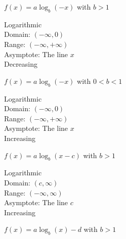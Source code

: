 \begin{multicols}{2}
\begin{center}
        $f(x) = a \log_b (- x)$ with $b > 1$

        Logarithmic\\
        Domain: $(-\infty, 0)$\\
        Range: $(-\infty, + \infty)$\\
        Asymptote: The line $x$\\
        Decreasing
        \vspace{10mm}
    \end{center}
    \hline
    \vspace{4mm}
    \begin{center}
        $f(x) = a \log_b (- x)$ with $0 < b < 1$

        Logarithmic\\
        Domain: $(-\infty, 0)$\\
        Range: $(-\infty, + \infty)$\\
        Asymptote: The line $x$\\
        Increasing
        \vspace{8mm}
    \end{center}
    \hline
    \begin{center}
        $f(x) = a \log_b (x - c)$ with $b > 1$

        Logarithmic\\
        Domain: $(c, \infty)$\\
        Range: $(-\infty, \infty)$\\
        Asymptote: The line $c$ \\
        Increasing
        \vspace{8mm}
    \end{center}
    \hline
    \begin{center}
        $f(x) = a \log_b (x) - d$ with $b > 1$


\end{center}
\end{multicols}
